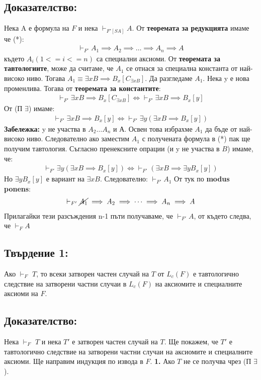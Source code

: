 \documentclass[french]{article}
\begin{document}
\subsection*{Доказателство:}
Нека A е формула на $F$ и нека $\vdash_{F'[SA]} A$. От \textbf{теоремата за редукцията} имаме че (*):
\begin{align*}
\vdash_{F'} A_1 \implies A_2 \implies \dots \implies A_n \implies A
\end{align*}
където $A_i (1<= i <= n)$ са специални аксиоми. От \textbf{теоремата за тавтологиите}, може да считаме, че $A_1$ се отнася за специална константа от най-високо ниво. Тогава $A_1 \equiv \exists x B \implies B_x[C_ {\exists x B}]$. Да разгледаме $A_1$. Нека y е нова променлива. Тогава от \textbf{теоремата за константите}:
\begin{align*}
\vdash_{F'} \exists x B \implies B_x[C_ {\exists x B}] \iff \vdash_{F'} \exists x B \implies B_x[y]
\end{align*}
От (П $\exists$) имаме: 
\begin{align*}
\vdash_{F'} \exists x B \implies B_x[y] \iff \vdash_{F'} \exists y(\exists x B \implies B_x[y])
\end{align*}
\textbf{Забележка:} y не участва в $A_2 \dots A_n$ и $А$. Освен това избрахме $A_1$ да бъде от най-високо ниво. Следователно ако заместим $A_1$ с получената формула в (*) пак ще получим тавтология. \newline
Съгласно пренексните опрации (и y не участва в $B$) имаме, че:
\begin{align*}
\vdash_{F'} \exists y(\exists x B \implies B_x[y]) \iff \vdash_{F'} (\exists x B \implies \exists y B_x[y]) 
\end{align*}
Но $ \exists y B_x[y]$ е вариант на $\exists x B$. Следователно: $\vdash_{F'} A_1$ От тук по \textbf{modus ponens}:
\begin{align*}
\vdash_{F'} \cancel{A_1} \implies A_2 \implies \dots \implies A_n \implies A
\end{align*}
Прилагайки тези разсъждения n-1 пъти получаваме, че $\vdash_{F'} A$, от където следва, че $\vdash_{F} A$

\subsection*{Твърдение 1:} Ако $\vdash_F$ $T$, то всеки затворен частен случай на $T$ от $L_c(F)$ е тавтологично следствие на затворени частни случаи в $L_c(F)$ на аксиомите и специалните аксиоми на $F$. 
\subsection*{Доказателство:} 
Нека $\vdash_F$ $T$ и нека $T'$ е затворен частен случай на $T$. \newline Ще покажем, че $T'$ е тавтологично следствие на затворени частни случаи на аксиомите и специалните аксиоми. Ще направим индукция по извода в $F$.
\newline\newline
\textbf{1.} Ако $T$ не се получва чрез (П $\exists$).
\end{document}
